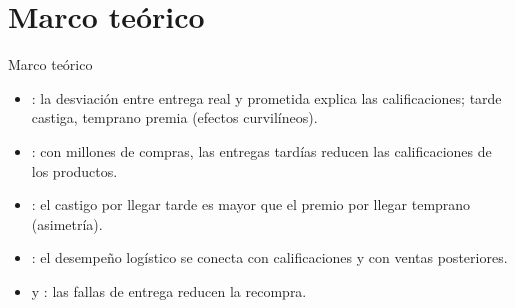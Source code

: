 \documentclass[11pt, aspectratio=169, table]{beamer}
\begin{document}
\section{Marco teórico}
\begin{frame}{Marco teórico}
    \begin{itemize}
        \setlength\itemsep{0.5em}
        \item \textcite{akturk2022}: la desviación entre entrega real y prometida explica las calificaciones; tarde castiga, temprano premia (efectos curvilíneos).
        \item \textcite{nozari2026}: con millones de compras, las entregas tardías reducen las calificaciones de los productos.
        \item \textcite{ravula2023}: el castigo por llegar tarde es mayor que el premio por llegar temprano (asimetría).
        \item \textcite{deshpande2023}: el desempeño logístico se conecta con calificaciones y con ventas posteriores.
        \item \textcite{rao2011} y \textcite{harter2025}: las fallas de entrega reducen la recompra.
    \end{itemize}
\end{frame}

\end{document}

